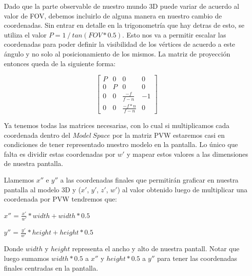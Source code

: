 \documentclass[a4paper]{article}
\begin{document}
Dado que la parte observable de nuestro mundo 3D puede variar de acuerdo al valor de FOV, debemos incluirlo de alguna manera en nuestro cambio de coordenadas. Sin entrar en detalle en la trigonometría que hay detras de esto, se utiliza el valor $P = 1 \ / \ tan(FOV * 0.5)$. Esto nos va a permitir escalar las coordenadas para poder definir la visibilidad de los vértices de acuerdo a este ángulo y no solo al posicionamiento de los mismos.
La matriz de proyección entonces queda de la siguiente forma:


\[
\begin{bmatrix}
P & 0 & 0 & 0 \\
0 & P & 0 & 0 \\
0 & 0 & \frac{-f}{f-n} & -1 \\
0 & 0 & \frac{-f*n}{f-n} & 0  
\end{bmatrix}
\]


Ya tenemos todas las matrices necesarias, con lo cual si multiplicamos cada coordenada dentro del $Model \ Space$ por la matriz PVW estaremos casi en condiciones de tener representado nuestro modelo en la pantalla. Lo único que falta es dividir estas coordenadas por $w'$ y mapear estos valores a las dimensiones de nuestra pantalla.\newline


Llamemos $x''$ e $y''$ a las coordenadas finales que permitirán graficar en nuestra pantalla al modelo 3D y ($x'$, $y'$, $z'$, $w'$) al valor obtenido luego de multiplicar una coordenada por PVW tendremos que: \newline

$x''$ = $\frac{x'}{w'}*width +  width*0.5$ \newline

$y''$ = $\frac{y'}{w'}*height +  height*0.5$ \newline

Donde $width$ y $height$ representa el ancho y alto de nuestra pantall. Notar que luego sumamos $width*0.5$ a $x''$ y $height*0.5$ a $y''$ para tener las coordenadas finales centradas en la pantalla.
\end{document}
